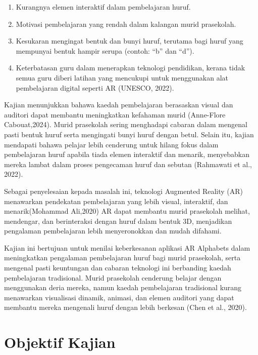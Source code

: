 \begin{enumerate}[label=\roman*.]
            \item Kurangnya elemen interaktif dalam pembelajaran huruf.
            \item Motivasi pembelajaran yang rendah dalam kalangan murid prasekolah.
            \item Kesukaran mengingat bentuk dan bunyi huruf, terutama bagi huruf yang mempunyai bentuk hampir serupa (contoh: ``b'' dan ``d'').
            \item Keterbatasan guru dalam menerapkan teknologi pendidikan, kerana tidak semua guru diberi latihan yang mencukupi untuk menggunakan alat pembelajaran digital seperti AR (UNESCO, 2022).
        \end{enumerate}
    

\hspace{1cm}Kajian menunjukkan bahawa kaedah pembelajaran berasaskan visual dan auditori dapat membantu meningkatkan kefahaman murid (Anne-Flore Cabouat,2024). Murid prasekolah sering menghadapi cabaran dalam mengenal pasti bentuk huruf serta mengingati bunyi huruf dengan betul. Selain itu, kajian mendapati bahawa pelajar lebih cenderung untuk hilang fokus dalam pembelajaran huruf apabila tiada elemen interaktif dan menarik, menyebabkan mereka lambat dalam proses pengecaman huruf dan sebutan (Rahmawati et al., 2022).

\hspace{1cm}Sebagai penyelesaian kepada masalah ini, teknologi Augmented Reality (AR) menawarkan pendekatan pembelajaran yang lebih visual, interaktif, dan menarik(Mohammad Ali,2020) AR dapat membantu murid prasekolah melihat, mendengar, dan berinteraksi dengan huruf dalam bentuk 3D, menjadikan pengalaman pembelajaran lebih menyeronokkan dan mudah difahami.

\hspace{1cm}Kajian ini bertujuan untuk menilai keberkesanan aplikasi AR Alphabets dalam meningkatkan pengalaman pembelajaran huruf bagi murid prasekolah, serta mengenal pasti keuntungan dan cabaran teknologi ini berbanding kaedah pembelajaran tradisional. Murid prasekolah cenderung belajar dengan menggunakan deria mereka, namun kaedah pembelajaran tradisional kurang menawarkan visualisasi dinamik, animasi, dan elemen auditori yang dapat membantu mereka mengenali huruf dengan lebih berkesan (Chen et al., 2020).

\section{Objektif Kajian}

